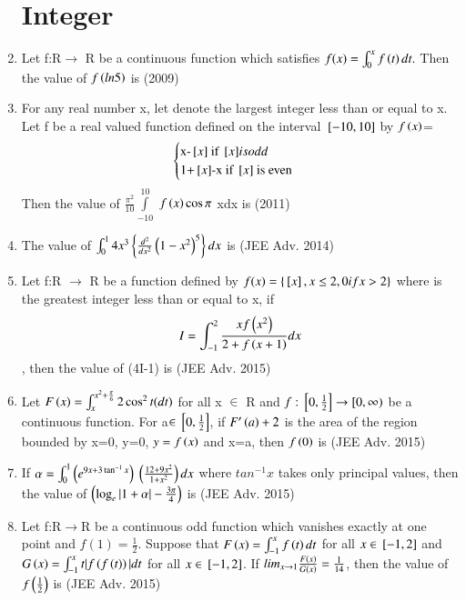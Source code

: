 \documentclass[journal,12pt,onecolumn]{IEEEtran}
\theoremstyle{remark}
\begin{document}
\begin{enumerate}
\section{Integer}
\item Let f:R$\rightarrow$ R be a continuous function which 
 satisfies $f(x)=\int_{0}^{x}f\left(t\right)dt.$ Then the value of $f\left(        ln5\right)$ is \hfill{(2009)}
  
         \item For any real number x, let denote the largest integer less than or equal to x. Let f be a real valued function defined on the interval ${}\left[-10,10\right]$ by $f\left(x\right)$=
   \[
   \begin{cases} 
    $x-\sbrak{x} if \sbrak{x}$ is odd \\ $1+\sbrak{x}-x if \sbrak{x} is even$
                 \end{cases}
          \]
  Then the value of $\frac{{\pi}^{2}}{10}\int\limits_{-10}^{10}$ $f\left(x\right)\cos\pi$ xdx is \hfill{(2011)}


         \item The value of $\int_{0}^{1} 4x^3 \left\{\frac{d^2}{dx^2}\left(1-x^2\right)^5 \right\}dx$ is \hfill{(JEE Adv. 2014)}

  \item Let f:R $\rightarrow$ R be a function defined by
  $f(x)=\left\{{}\left[x\right],x \leq2, 0 if x>2 \right\}$
  where  is the greatest integer less than or equal to x, if 
  \[ I=\int_{-1}^{2} \frac{xf\left(x^2\right)}{2+f\left(x+1\right)}dx \],
      then the value of (4I-1) is \hfill{(JEE Adv. 2015)}   
\item Let $F\left(x\right)=\int_{x}^{x^2 +\frac{\pi}{6}} 2\cos^2t(dt)$
 for all x $\in$ R and $f:{}\left[0,\frac{1}{2}\right]\rightarrow[0,\infty)$ be a continuous function. For a$\in{}\left[0,\frac{1}{2}\right]$, if $F^\prime\left(a\right)+2$ is the area of the region bounded by x=0, y=0, $y=f\left(x\right)$ and x=a, then $f\left(0\right)$ is   \hfill{(JEE Adv. 2015)}

\item If $\alpha=\int_{0}^{1}\brak{e^{9x+3\tan^{-1}x} } \ \brak{ \frac{12+9x^2}{1+x^2}}dx$ where $tan^{-1}x$ takes only principal values,
 then the value of $\left(\log_e |1+\alpha|-\frac{3\pi}{4}\right)$ is  \hfill{(JEE Adv. 2015)} 

\item Let f:R$\rightarrow$R be a continuous odd function which vanishes exactly at one point and $f(1)=\frac{1}{2}$. Suppose that $F\left(x\right)=\int_{-1}^{x}f\left(t\right)dt$ for all $x\in{}\left[-1,2\right]$ and $G\left(x\right)=\int_{-1}^{x}t|f\left(f\left(t\right)\right)|dt$ for all $x\in {}\left[-1,2\right]$. If $lim_{x\to 1} \frac{F\left(x\right)}{G\left(x\right)}=\frac{1}{14}$, then the value of $f\left(\frac{1}{2}\right)$ is  \hfill{(JEE Adv. 2015)}


\end{enumerate}
\end{document}
